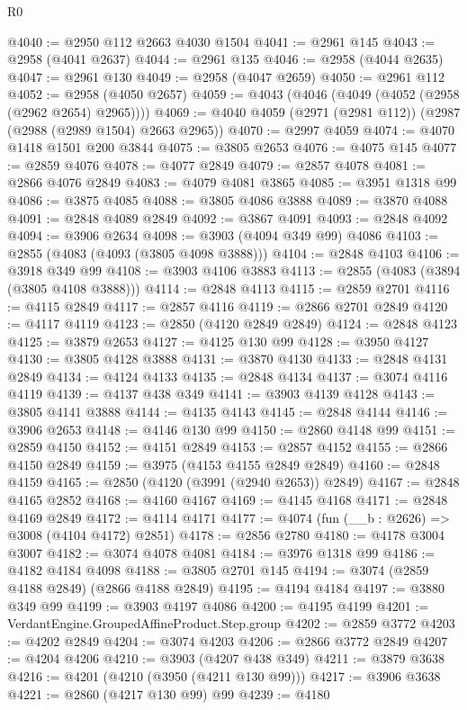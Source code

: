 \begin{lexlean}{R0}
\begin{coremodule}
@4040 := @2950 @112 @2663 @4030 @1504
@4041 := @2961 @145
@4043 := @2958 (@4041 @2637)
@4044 := @2961 @135
@4046 := @2958 (@4044 @2635)
@4047 := @2961 @130
@4049 := @2958 (@4047 @2659)
@4050 := @2961 @112
@4052 := @2958 (@4050 @2657)
@4059 := @4043 (@4046 (@4049 (@4052 (@2958 (@2962 @2654) @2965))))
@4069 := @4040 @4059 (@2971 (@2981 @112)) (@2987 (@2988 (@2989 @1504) @2663 @2965))
@4070 := @2997 @4059
@4074 := @4070 @1418 @1501 @200 @3844
@4075 := @3805 @2653
@4076 := @4075 @145
@4077 := @2859 @4076
@4078 := @4077 @2849
@4079 := @2857 @4078
@4081 := @2866 @4076 @2849
@4083 := @4079 @4081 @3865
@4085 := @3951 @1318 @99
@4086 := @3875 @4085
@4088 := @3805 @4086 @3888
@4089 := @3870 @4088
@4091 := @2848 @4089 @2849
@4092 := @3867 @4091
@4093 := @2848 @4092
@4094 := @3906 @2634
@4098 := @3903 (@4094 @349 @99) @4086
@4103 := @2855 (@4083 (@4093 (@3805 @4098 @3888)))
@4104 := @2848 @4103
@4106 := @3918 @349 @99
@4108 := @3903 @4106 @3883
@4113 := @2855 (@4083 (@3894 (@3805 @4108 @3888)))
@4114 := @2848 @4113
@4115 := @2859 @2701
@4116 := @4115 @2849
@4117 := @2857 @4116
@4119 := @2866 @2701 @2849
@4120 := @4117 @4119
@4123 := @2850 (@4120 @2849 @2849)
@4124 := @2848 @4123
@4125 := @3879 @2653
@4127 := @4125 @130 @99
@4128 := @3950 @4127
@4130 := @3805 @4128 @3888
@4131 := @3870 @4130
@4133 := @2848 @4131 @2849
@4134 := @4124 @4133
@4135 := @2848 @4134
@4137 := @3074 @4116 @4119
@4139 := @4137 @438 @349
@4141 := @3903 @4139 @4128
@4143 := @3805 @4141 @3888
@4144 := @4135 @4143
@4145 := @2848 @4144
@4146 := @3906 @2653
@4148 := @4146 @130 @99
@4150 := @2860 @4148 @99
@4151 := @2859 @4150
@4152 := @4151 @2849
@4153 := @2857 @4152
@4155 := @2866 @4150 @2849
@4159 := @3975 (@4153 @4155 @2849 @2849)
@4160 := @2848 @4159
@4165 := @2850 (@4120 (@3991 (@2940 @2653)) @2849)
@4167 := @2848 @4165 @2852
@4168 := @4160 @4167
@4169 := @4145 @4168
@4171 := @2848 @4169 @2849
@4172 := @4114 @4171
@4177 := @4074 (fun (__b : @2626) => @3008 (@4104 @4172) @2851)
@4178 := @2856 @2780
@4180 := @4178 @3004 @3007
@4182 := @3074 @4078 @4081
@4184 := @3976 @1318 @99
@4186 := @4182 @4184 @4098
@4188 := @3805 @2701 @145
@4194 := @3074 (@2859 @4188 @2849) (@2866 @4188 @2849)
@4195 := @4194 @4184
@4197 := @3880 @349 @99
@4199 := @3903 @4197 @4086
@4200 := @4195 @4199
@4201 := VerdantEngine.GroupedAffineProduct.Step.group
@4202 := @2859 @3772
@4203 := @4202 @2849
@4204 := @3074 @4203
@4206 := @2866 @3772 @2849
@4207 := @4204 @4206
@4210 := @3903 (@4207 @438 @349)
@4211 := @3879 @3638
@4216 := @4201 (@4210 (@3950 (@4211 @130 @99)))
@4217 := @3906 @3638
@4221 := @2860 (@4217 @130 @99) @99
@4239 := @4180

\end{coremodule}
\end{lexlean}
